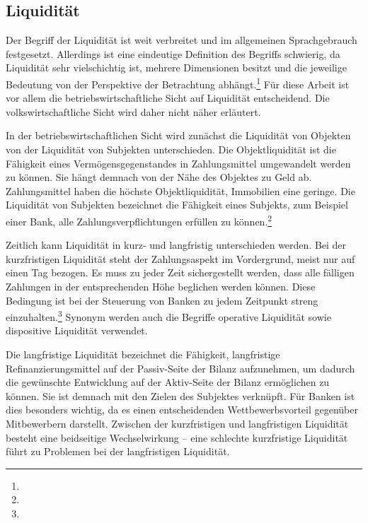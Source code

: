 \begin{onehalfspacing}
\section{Liquidität} 
Der Begriff der Liquidität ist weit verbreitet und im allgemeinen Sprachgebrauch festgesetzt. Allerdings ist eine eindeutige Definition des Begriffs schwierig, da Liquidität sehr vielschichtig ist, mehrere Dimensionen besitzt und die jeweilige Bedeutung von der Perspektive der Betrachtung abhängt.\footnote{ } Für diese Arbeit ist vor allem die betriebswirtschaftliche Sicht auf Liquidität entscheidend. Die volkswirtschaftliche Sicht wird daher nicht näher erläutert.

In der betriebswirtschaftlichen Sicht wird zunächst die Liquidität von Objekten von der Liquidität von Subjekten unterschieden. Die Objektliquidität ist die Fähigkeit eines Vermögensgegenstandes in Zahlungsmittel umgewandelt werden zu können. Sie hängt demnach von der Nähe des Objektes zu Geld ab. Zahlungsmittel haben die höchste Objektliquidität, Immobilien eine geringe. Die Liquidität von Subjekten bezeichnet die Fähigkeit eines Subjekts, zum Beispiel einer Bank, alle Zahlungsverpflichtungen erfüllen zu können.\footnote{ }

Zeitlich kann Liquidität in kurz- und langfristig unterschieden werden. Bei der kurzfristigen Liquidität steht der Zahlungsaspekt im Vordergrund, meist nur auf einen Tag bezogen. Es muss zu jeder Zeit sichergestellt werden, dass alle fälligen Zahlungen in der entsprechenden Höhe beglichen werden können. Diese Bedingung ist bei der Steuerung von Banken zu jedem Zeitpunkt streng einzuhalten.\footnote{ } Synonym werden auch die Begriffe operative Liquidität sowie dispositive Liquidität verwendet.

Die langfristige Liquidität bezeichnet die Fähigkeit, langfristige Refinanzierungsmittel auf der Passiv-Seite der Bilanz aufzunehmen, um dadurch die gewünschte Entwicklung auf der Aktiv-Seite der Bilanz ermöglichen zu können. Sie ist demnach mit den Zielen des Subjektes verknüpft. Für Banken ist dies besonders wichtig, da es einen entscheidenden Wettbewerbsvorteil gegenüber Mitbewerbern darstellt. Zwischen der kurzfristigen und langfristigen Liquidität besteht eine beidseitige Wechselwirkung -- eine schlechte kurzfristige Liquidität führt zu Problemen bei der langfristigen Liquidität.


\end{onehalfspacing}
